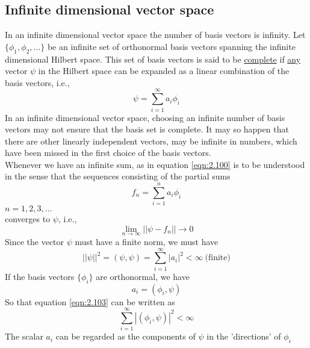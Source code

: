 \subsection{Infinite dimensional vector space}
In an infinite dimensional vector space the number of basis vectors is infinity. Let $\{\phi_1, \phi_2, \ldots \}$ be an infinite set of orthonormal basis vectors spanning the infinite dimensional Hilbert space. This set of basis vectors is said to be \underline{complete} if \underline{any} vector $\psi$ in the Hilbert space  can be expanded as a linear combination of the basis vectors, i.e.,
\begin{equation}\label{eqn:2.100}
\psi = \sum_{i=1}^{\infty} a_i \phi_i
\end{equation}
In an infinite dimensional vector space, choosing an infinite number of basis vectors may not ensure that the basis set is complete. It may so happen that there are other linearly independent vectors, may be infinite in numbers, which have been missed in the first choice of the basis vectors.\\
Whenever we have an infinite sum, as in equation \ref{eqn:2.100} is to be understood in the sense that the sequences consisting of the partial sums
\begin{equation}\label{eqn:2.101}
f_n = \sum_{i=1}^{n} a_i \phi_i
\end{equation}
$n = 1,2,3,\ldots$ \\
converges to $\psi$, i.e.,
\begin{equation}\label{eqn:2.102}
\lim\limits_{n \rightarrow \infty} ||\psi - f_n || \rightarrow 0
\end{equation}
Since the vector $\psi$ must have a finite norm, we must have
\begin{equation}\label{eqn:2.103}
||\psi ||^2 = (\psi, \psi) = \sum_{i=1}^{\infty} |a_i|^2 < \infty \ \text{(finite)}
\end{equation}
If the basis vectors $\{\phi_i \}$ are orthonormal, we have
\begin{equation}\label{eqn:2.104}
a_i = (\phi_i, \psi)
\end{equation}
So that equation \ref{eqn:2.103} can be written as
\begin{equation}
\sum_{i=1}^{\infty} |(\phi_i, \psi)|^2 < \infty
\end{equation}
The scalar $a_i$ can be regarded as the components of $\psi$ in the 'directions' of $\phi_i$


